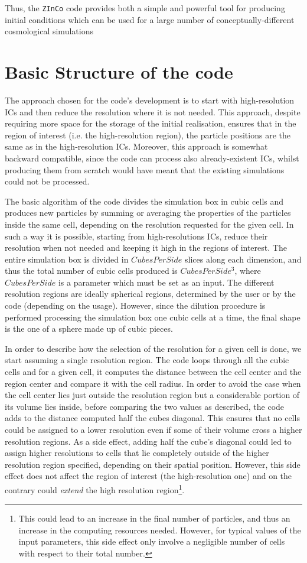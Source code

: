 \documentclass[11pt,a4paper,titlepage]{article}
\newcommand{\zinco}{\texttt{ZInCo}\xspace}
\begin{document}
Thus, the \zinco code provides both a simple and powerful tool for producing initial conditions which can be used for a large number of conceptually-different cosmological simulations

\section{Basic Structure of the code}
\label{Basic_struct}
The approach chosen for the code's development is to start with high-resolution ICs and then reduce the resolution where it is not needed. This approach, despite requiring more space for the storage of the initial realisation, ensures that in the region of interest (i.e. the high-resolution region), the particle positions are the same as in the high-resolution ICs. Moreover, this approach is somewhat backward compatible, since the code can process also already-existent ICs, whilst producing them from scratch would have meant that the existing simulations could not be processed.

The basic algorithm of the code divides the simulation box in cubic cells and produces new particles by summing or averaging the properties of the particles inside the same cell, depending on the resolution requested for the given cell. In such a way it is possible, starting from high-resolutions ICs, reduce their resolution when not needed and keeping it high in the regions of interest. The entire simulation box is divided in $CubesPerSide$ slices along each dimension, and thus the total number of cubic cells produced is $CubesPerSide^3$, where $CubesPerSide$ is a parameter which must be set as an input. The different resolution regions are ideally spherical regions, determined by the user or by the code (depending on the usage). However, since the dilution procedure is performed processing the simulation box one cubic cells at a time, the final shape is the one of a sphere made up of cubic pieces.

In order to describe how the selection of the resolution for a given cell is done, we start assuming a single resolution region. The code loops through all the cubic cells and for a given cell, it computes the distance between the cell center and the region center and compare it with the cell radius. In order to avoid the case when the cell center lies just outside the resolution region but a considerable portion of its volume lies inside, before comparing the two values as described, the code adds to the distance computed half the cubes diagonal. This ensures that no cells could be assigned to a lower resolution even if some of their volume cross a higher resolution regions. As a side effect, adding half the cube's diagonal could led to assign higher resolutions to cells that lie completely outside of the higher resolution region specified, depending on their spatial position. However, this side effect does not affect the region of interest (the high-resolution one) and on the contrary could \emph{extend} the high resolution region\footnote{This could lead to an increase in the final number of particles, and thus an increase in the computing resources needed. However, for typical values of the input parameters, this side effect only involve a negligible number of cells with respect to their total number.}.
\end{document}
